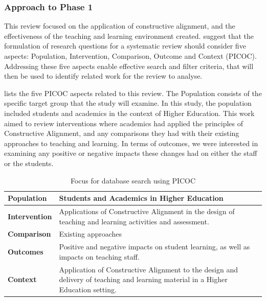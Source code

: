 \subsubsection{Approach to Phase 1} %
\label{sub:review_questions}

This review focused on the application of constructive alignment, and the effectiveness of the teaching and learning environment created. \citet{Petticrew:2008} suggest that the formulation of research questions for a systematic review should consider five aspects: Population, Intervention, Comparison, Outcome and Context (PICOC). Addressing these five aspects enable effective search and filter criteria, that will then be used to identify related work for the review to analyse.

 lists the five PICOC aspects related to this review. The Population consists of the specific target group that the study will examine. In this study, the population included students and academics in the context of Higher Education. This work aimed to review interventions where academics had applied the principles of Constructive Alignment, and any comparisons they had with their existing approaches to teaching and learning. In terms of outcomes, we were interested in examining any positive or negative impacts these changes had on either the staff or the students.

\begin{table}[h]
	\centering
	\caption{Focus for database search using PICOC}
	\label{tbl:picoc}

    \begin{tabular}{|l|p{8cm}|}
    \hline
    \textbf{Population} & Students and Academics in Higher Education\\ \hline
    \textbf{Intervention} & Applications of Constructive Alignment in the design of teaching and learning activities and assessment. \\ \hline
    \textbf{Comparison} & Existing approaches \\ \hline
    \textbf{Outcomes} & Positive and negative impacts on student learning, as well as impacts on teaching staff. \\ \hline
    \textbf{Context} & Application of Constructive Alignment to the design and delivery of teaching and learning material in a Higher Education setting. \\ \hline
    \end{tabular}
\end{table}


